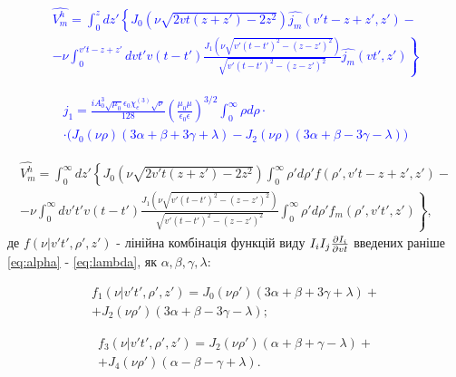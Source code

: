 \textcolor{blue} { \begin{equation*} \begin{aligned}
\hat{V_m^h} = \int_0^z dz' 
\left\{ J_0 \left( \nu \sqrt{2 vt (z + z') - 2 z^2} \right) 
\hat{j_m} (v't - z + z',z') - \right. \\ 
\left. - \nu \int_0^{v't - z + z'} dvt' v (t-t') 
\frac{J_1 \left( \nu \sqrt{v'(t-t')^2 - (z-z')^2} \right)}
{\sqrt{v'(t-t')^2 - (z-z')^2}} \hat{j_m} (vt',z')  \right\}
\end{aligned} \end{equation*} }

\textcolor{blue} { \begin{equation*} \begin{aligned}
j_1 = \frac{i A_0^3 \sqrt{\mu_0} \epsilon_0 \chi_e^{(3)} \sqrt{\nu}}{128}
\left( \frac{\mu_0 \mu}{\epsilon_0 \epsilon} \right)^{3/2}
\int_0^\infty \rho d \rho \cdot \\ \cdot
\Big( J_0 (\nu \rho) ( 3 \alpha + \beta + 3 \gamma + \lambda) - 
J_2 (\nu \rho) ( 3 \alpha + \beta - 3 \gamma - \lambda ) \Big)
\end{aligned} \end{equation*} }

\begin{equation} \begin{aligned} \label{eq:vmh_final}
\hat{V_m^h} = \int_{0}^{\infty} dz'
\left\{ J_0 \left( \nu \sqrt{2 v't (z + z') - 2 z^2} \right) 
\int_{0}^{\infty} \rho' d \rho'
f (\rho',v't - z + z',z') - \right. \\ 
\left. - \nu \int_{0}^{\infty} dv't' v (t-t') 
\frac{J_1 \left( \nu \sqrt{v'(t-t')^2 - (z-z')^2} \right)}
{\sqrt{v'(t-t')^2 - (z-z')^2}} 
\int_{0}^{\infty} \rho' d\rho'
f_m (\rho',v't',z')  \right\},
\end{aligned} \end{equation}
%
де $ f ( \nu | v't', \rho', z') $ - лінійна комбінація функцій виду
$ I_i I_j \frac{\partial I_i}{\partial vt} $ введених раніше \eqref{eq:alpha} - 
\eqref{eq:lambda}, як $ \alpha, \beta, \gamma, \lambda $:

\begin{equation} \begin{aligned}
f_1 ( \nu | v't', \rho', z') = 
J_0 (\nu \rho') (3 \alpha + \beta + 3 \gamma + \lambda) + \\
+ J_2 (\nu \rho') (3 \alpha + \beta - 3 \gamma - \lambda);
\end{aligned} \end{equation}

\begin{equation} \begin{aligned}
f_3 ( \nu | v't', \rho', z') = 
J_2 (\nu \rho') (\alpha + \beta + \gamma - \lambda) + \\
+ J_4 (\nu \rho') (\alpha - \beta - \gamma + \lambda).
\end{aligned} \end{equation}

